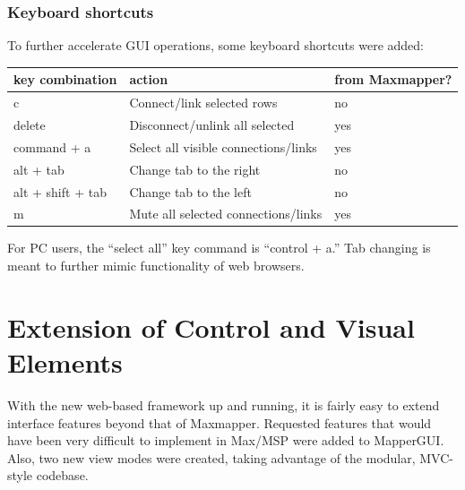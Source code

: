
		\subsubsection{Keyboard shortcuts}

To further accelerate GUI operations, some keyboard shortcuts were added:

\begin{table}[!h]
	\centering
	\label{tab:list_view_shortcut_keys}
		\begin{tabular}{l  l  l}
		\hline\hline
		key combination&action&from Maxmapper?\\
		\hline
		c 					& Connect/link selected rows & no\\
		delete 				& Disconnect/unlink all selected & yes\\
		command + a 		& Select all visible connections/links & yes\\
		alt + tab 			& Change tab to the right & no\\
		alt + shift + tab 	& Change tab to the left & no\\ 
		m 					& Mute all selected connections/links & yes\\
		\end{tabular}
\end{table}

For PC users, the ``select all'' key command is ``control + a.'' Tab changing is meant to further mimic functionality of web browsers. 



\section{Extension of Control and Visual Elements} %
\label{sec:extension_of_control_and_visual_elements}

With the new web-based framework up and running, it is fairly easy to extend interface features beyond that of Maxmapper. Requested features that would have been very difficult to implement in Max/MSP were added to MapperGUI. Also, two new view modes were created, taking advantage of the modular, MVC-style codebase.

